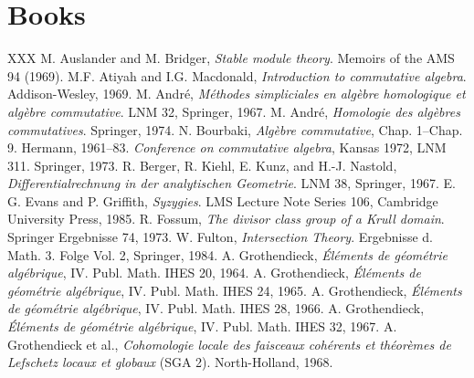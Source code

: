 
\section*{Books}
\begin{thebibliography}{XXX}
 M. Auslander and M. Bridger, \textit{Stable module theory}. Memoirs of the AMS 94 (1969).
 M.F. Atiyah and I.G. Macdonald, \textit{Introduction to commutative algebra}. Addison-Wesley, 1969.
 M. Andr\'e, \textit{M\'ethodes simpliciales en alg\`ebre homologique et alg\`ebre commutative}. LNM 32, Springer, 1967.
 M. Andr\'e, \textit{Homologie des alg\`ebres commutatives}. Springer, 1974.
 N. Bourbaki, \textit{Alg\`ebre commutative}, Chap. 1--Chap. 9. Hermann, 1961--83.
 \textit{Conference on commutative algebra}, Kansas 1972, LNM 311. Springer, 1973.
 R. Berger, R. Kiehl, E. Kunz, and H.-J. Nastold, \textit{Differentialrechnung in der analytischen Geometrie}. LNM 38, Springer, 1967.
 E. G. Evans and P. Griffith, \textit{Syzygies}. LMS Lecture Note Series 106, Cambridge University Press, 1985.
 R. Fossum, \textit{The divisor class group of a Krull domain}. Springer Ergebnisse 74, 1973.
 W. Fulton, \textit{Intersection Theory}. Ergebnisse d. Math. 3. Folge Vol. 2, Springer, 1984.
 A. Grothendieck, \textit{\'El\'ements de g\'eom\'etrie alg\'ebrique}, IV. Publ. Math. IHES 20, 1964.
 A. Grothendieck, \textit{\'El\'ements de g\'eom\'etrie alg\'ebrique}, IV. Publ. Math. IHES 24, 1965.
 A. Grothendieck, \textit{\'El\'ements de g\'eom\'etrie alg\'ebrique}, IV. Publ. Math. IHES 28, 1966.
 A. Grothendieck, \textit{\'El\'ements de g\'eom\'etrie alg\'ebrique}, IV. Publ. Math. IHES 32, 1967.
 A. Grothendieck et al., \textit{Cohomologie locale des faisceaux coh\'erents et th\'eor\`emes de Lefschetz locaux et globaux} (SGA 2). North-Holland, 1968.

\end{thebibliography}
